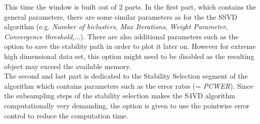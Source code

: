 \documentclass[a4paper]{article}\usepackage[]{graphicx}\usepackage[]{color}
\begin{document}
\noindent This time the window is built out of 2 parts. In the first part, which
contains the general parameters, there are some similar parameters as for the
the SSVD algorithm (e.g. {\it Number of biclusters}, {\it Max Iterations}, {\it
Weight Parameter}, {\it Convergence threshold},...). There are also additional
parameters such as the option to save the stability path in order to plot it
later on. However for extreme high dimensional data set, this option might need
to be disabled as the resulting object may exceed the available memory.\\
The second and last part is dedicated to the Stability Selection segment of the
algorithm which contains parameters such as the error rates (= {\it PCWER}).
Since the subsampling steps of the stability selection makes the S4VD algorithm
computationally very demanding, the option is given to use the pointwise error
control to reduce the computation time.
\end{document}
